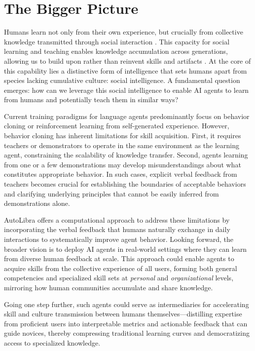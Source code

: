 \documentclass[../main.tex]{subfiles}
\begin{document}
	\section{The Bigger Picture}

	Humans learn not only from their own experience, but crucially from collective
	knowledge transmitted through social interaction \citep{tomasello1993cultural}. This
	capacity for social learning and teaching enables knowledge accumulation across
	generations, allowing us to build upon rather than reinvent skills and artifacts
	\citep{humphrey1976social}. At the core of this capability lies a distinctive
	form of intelligence that sets humans apart from species lacking cumulative culture:
	social intelligence. A fundamental question emerges: how can we leverage this social
	intelligence to enable AI agents to learn from humans and potentially teach them
	in similar ways?

	Current training paradigms for language agents predominantly focus on behavior
	cloning or reinforcement learning from self-generated experience. However, behavior
	cloning has inherent limitations for skill acquisition. First, it requires teachers
	or demonstrators to operate in the same environment as the learning agent, constraining
	the scalability of knowledge transfer. Second, agents learning from one or a few
	demonstrations may develop misunderstandings about what constitutes appropriate
	behavior. In such cases, explicit verbal feedback from teachers becomes crucial for
	establishing the boundaries of acceptable behaviors and clarifying underlying principles
	that cannot be easily inferred from demonstrations alone.

	AutoLibra offers a computational approach to address these limitations by incorporating
	the verbal feedback that humans naturally exchange in daily interactions to systematically
	improve agent behavior. Looking forward, the broader vision is to deploy AI agents
	in real-world settings where they can learn from diverse human feedback at scale.
	This approach could enable agents to acquire skills from the collective experience
	of all users, forming both general competencies and specialized skill sets at
	\emph{personal} and \emph{organizational} levels, mirroring how human communities
	accumulate and share knowledge.

	Going one step further, such agents could serve as intermediaries for accelerating
	skill and culture transmission between humans themselves---distilling expertise from
	proficient users into interpretable metrics and actionable feedback that can guide
	novices, thereby compressing traditional learning curves and democratizing access
	to specialized knowledge.  
	
\end{document}
